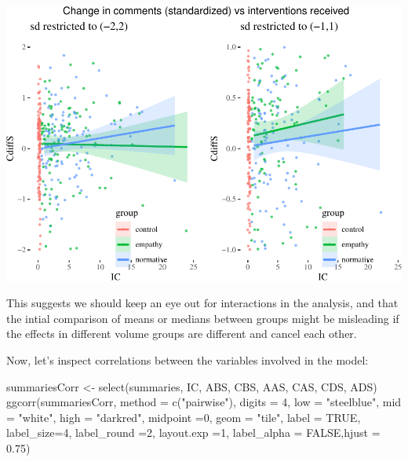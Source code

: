 \documentclass[
  10pt,
  dvipsnames,enabledeprecatedfontcommands]{scrartcl}
\newenvironment{Shaded}{\begin{snugshade}}{\end{snugshade}}
\newcommand{\AttributeTok}[1]{\textcolor[rgb]{0.77,0.63,0.00}{#1}}
\newcommand{\ConstantTok}[1]{\textcolor[rgb]{0.00,0.00,0.00}{#1}}
\newcommand{\DecValTok}[1]{\textcolor[rgb]{0.00,0.00,0.81}{#1}}
\newcommand{\FloatTok}[1]{\textcolor[rgb]{0.00,0.00,0.81}{#1}}
\newcommand{\FunctionTok}[1]{\textcolor[rgb]{0.00,0.00,0.00}{#1}}
\newcommand{\NormalTok}[1]{#1}
\newcommand{\OtherTok}[1]{\textcolor[rgb]{0.56,0.35,0.01}{#1}}
\newcommand{\StringTok}[1]{\textcolor[rgb]{0.31,0.60,0.02}{#1}}
\begin{document}
\begin{center}\includegraphics[width=1\linewidth]{bayesianReport3_files/figure-latex/icc-1} \end{center}
\normalsize

This suggests we should keep an eye out for interactions in the
analysis, and that the intial comparison of means or medians between
groups might be misleading if the effects in different volume groups are
different and cancel each other.

Now, let's inspect correlations between the variables involved in the
model:

\vspace{1mm}
\footnotesize

\begin{Shaded}
\begin{Highlighting}[]
\NormalTok{summariesCorr }\OtherTok{\textless{}{-}} \FunctionTok{select}\NormalTok{(summaries, IC, ABS, CBS, AAS, CAS, CDS, ADS)}
\FunctionTok{ggcorr}\NormalTok{(summariesCorr, }\AttributeTok{method =} \FunctionTok{c}\NormalTok{(}\StringTok{"pairwise"}\NormalTok{),}
       \AttributeTok{digits =} \DecValTok{4}\NormalTok{, }\AttributeTok{low =} \StringTok{"steelblue"}\NormalTok{, }\AttributeTok{mid =} \StringTok{"white"}\NormalTok{,}
       \AttributeTok{high =} \StringTok{"darkred"}\NormalTok{, }\AttributeTok{midpoint =}\DecValTok{0}\NormalTok{,}
       \AttributeTok{geom =} \StringTok{"tile"}\NormalTok{, }\AttributeTok{label =} \ConstantTok{TRUE}\NormalTok{, }\AttributeTok{label\_size=}\DecValTok{4}\NormalTok{, }\AttributeTok{label\_round =}\DecValTok{2}\NormalTok{, }\AttributeTok{layout.exp =}\DecValTok{1}\NormalTok{,}
       \AttributeTok{label\_alpha =} \ConstantTok{FALSE}\NormalTok{,}\AttributeTok{hjust =} \FloatTok{0.75}\NormalTok{)}
\end{Highlighting}
\end{Shaded}
\end{document}
